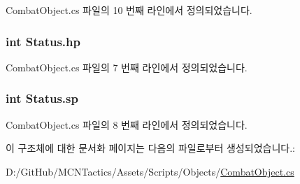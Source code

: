 Combat\+Object.\+cs 파일의 10 번째 라인에서 정의되었습니다.

\subsubsection[{\texorpdfstring{hp}{hp}}]{\setlength{\rightskip}{0pt plus 5cm}int Status.\+hp}\hypertarget{struct_status_a6912591952ae3178114200d6383919df}{}\label{struct_status_a6912591952ae3178114200d6383919df}


Combat\+Object.\+cs 파일의 7 번째 라인에서 정의되었습니다.

\subsubsection[{\texorpdfstring{sp}{sp}}]{\setlength{\rightskip}{0pt plus 5cm}int Status.\+sp}\hypertarget{struct_status_a685aa4b12faa74a48a3b57f69e94084c}{}\label{struct_status_a685aa4b12faa74a48a3b57f69e94084c}


Combat\+Object.\+cs 파일의 8 번째 라인에서 정의되었습니다.



이 구조체에 대한 문서화 페이지는 다음의 파일로부터 생성되었습니다.\+:\begin{DoxyCompactItemize}
\item 
D\+:/\+Git\+Hub/\+M\+C\+N\+Tactics/\+Assets/\+Scripts/\+Objects/\hyperlink{_combat_object_8cs}{Combat\+Object.\+cs}\end{DoxyCompactItemize}
